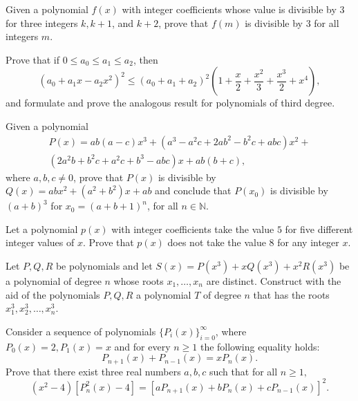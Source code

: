 \documentclass[12pt,a4paper]{memoir}
\theoremstyle{definition}
\begin{document}
\begin{question}[name={1969 IMO Longlist}]
	Given a polynomial $f(x)$ with integer coefficients whose value is divisible by $3$ for three integers $k, k +1$, and $k +2$, prove that $f(m)$ is divisible by $3$ for all integers $m$.
\end{question}





\begin{question}[name={1969 IMO Longlist}]
	Prove that if $0\leq a_0 \leq a_1 \leq a_2$, then 
	\[(a_0+a_1x-a_2x^2)^2 \leq (a_0+a_1+a_2)^2 \left(1+\frac{x}{2}+\frac{x^2}{3}+\frac{x^3}{2}+x^4\right),\]
	and formulate and prove the analogous result for polynomials of third degree.
\end{question}


\begin{question}[name={1970 IMO Longlist}]
	Given a polynomial
	\begin{multline*}
		P(x) = ab(a-c)x^3 +(a^3-a^2c+2ab^2-b^2c+abc)x^2 +\\
		(2a^2b+b^2c+a^2c+b^3-abc)x+ab(b+c),
	\end{multline*}
	where $a,b, c \neq  0$, prove that $P(x)$ is divisible by $Q(x) = abx^2 +(a^2 +b^2)x+ab$ and conclude that $P(x_0)$ is divisible by $(a+b)^3$ for $x_0 = (a+b+1)^n$, for all $n \in\mathbb N$.
\end{question}


\begin{question}[name={1970 IMO Longlist}]
	Let a polynomial $p(x)$ with integer coefficients take the value $5$ for five different integer values of $x$. Prove that $p(x)$ does not take the value $8$ for any integer $x$.
\end{question}

\begin{question}[name={1970 IMO Shortlist}]
	Let $P,Q,R$ be polynomials and let $S(x) = P(x^3) + xQ(x^3) + x^2R(x^3)$ be a polynomial of degree $n$ whose roots $x_1,\dots, x_n$ are distinct. Construct with the aid of the polynomials $P,Q,R$ a polynomial $T$ of degree $n$ that has the roots $x_1^3 , x_2^3 , \dots, x_n^3.$
\end{question}

\begin{question}[name={1971 IMO Shortlist}]
	Consider a sequence of polynomials $\{P_i(x)\}_{i=0}^{\infty}$, where $P_0(x) = 2, P_1(x) = x$ and for every $n \geq 1$ the following equality holds: \[P_{n+1}(x) + P_{n-1}(x) = xP_n(x).\]
	Prove that there exist three real numbers $a, b, c$ such that for all $n \geq 1,$ \[(x^2 - 4)[P_n^2(x) - 4] = [aP_{n+1}(x) + bP_n(x) + cP_{n-1}(x)]^2.\]
\end{question}
\end{document}
